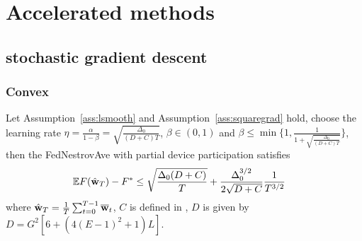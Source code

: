 \section{Accelerated methods}
\subsection{stochastic gradient descent}
\subsubsection{Convex}
\begin{theorem}
	Let Assumption~\ref{ass:lsmooth} and Assumption~\ref{ass:squaregrad} hold,  choose the learning rate $\eta = \frac{\alpha}{1 - \beta} = \sqrt{\frac{\Delta_0}{(D+C)T}}$, $\beta \in (0, 1)$ and $\beta \leq \min\{1, \frac{1}{1 + \sqrt{\frac{\Delta_0}{(D+C)T}}}\}$, then the FedNestrovAve with partial device participation satisfies
	\begin{align}
		 \mathbb{E} F(\hat{{\mathbf{w}}}_T) - F^* &\leq \sqrt{\frac{\Delta_0(D + C)}{T}} + \frac{\Delta_0^{3/2}}{2\sqrt{D+C}}\frac{1}{T^{3/2}} 
	\end{align}
	where $\hat{{\mathbf{w}}}_T = \frac{1}{T}\sum_{t=0}^{T-1} {\overline{\mathbf{w}}}_t$, $C$ is defined in \eq{\ref{eq:partialsample}},
$D$ is given by $D =  G^2[6 + (4(E-1)^2+1)L]$.
\end{theorem}

